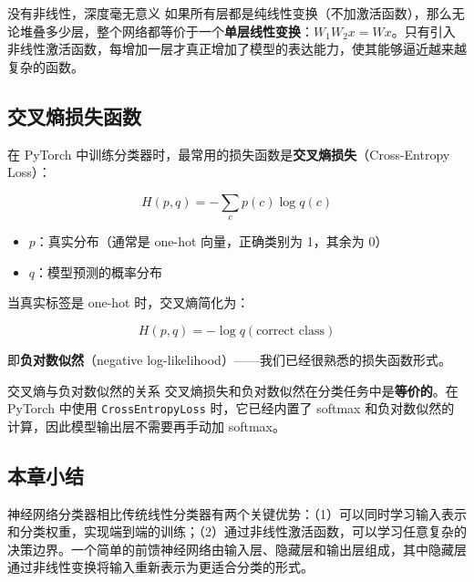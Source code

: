 \begin{warningbox}{没有非线性，深度毫无意义}
如果所有层都是纯线性变换（不加激活函数），那么无论堆叠多少层，整个网络都等价于一个\textbf{单层线性变换}：$W_1 W_2 x = Wx$。只有引入非线性激活函数，每增加一层才真正增加了模型的表达能力，使其能够逼近越来越复杂的函数。
\end{warningbox}

\subsection{交叉熵损失函数}

在 PyTorch 中训练分类器时，最常用的损失函数是\textbf{交叉熵损失}（Cross-Entropy Loss）：

$$H(p, q) = -\sum_c p(c) \log q(c)$$

\begin{itemize}
    \item $p$：真实分布（通常是 one-hot 向量，正确类别为 1，其余为 0）
    \item $q$：模型预测的概率分布
\end{itemize}

当真实标签是 one-hot 时，交叉熵简化为：

$$H(p, q) = -\log q(\text{correct class})$$

即\textbf{负对数似然}（negative log-likelihood）——我们已经很熟悉的损失函数形式。

\begin{knowledgebox}{交叉熵与负对数似然的关系}
交叉熵损失和负对数似然在分类任务中是\textbf{等价的}。在 PyTorch 中使用 \texttt{CrossEntropyLoss} 时，它已经内置了 softmax 和负对数似然的计算，因此模型输出层不需要再手动加 softmax。
\end{knowledgebox}

\subsection{本章小结}

神经网络分类器相比传统线性分类器有两个关键优势：（1）可以同时学习输入表示和分类权重，实现端到端的训练；（2）通过非线性激活函数，可以学习任意复杂的决策边界。一个简单的前馈神经网络由输入层、隐藏层和输出层组成，其中隐藏层通过非线性变换将输入重新表示为更适合分类的形式。


